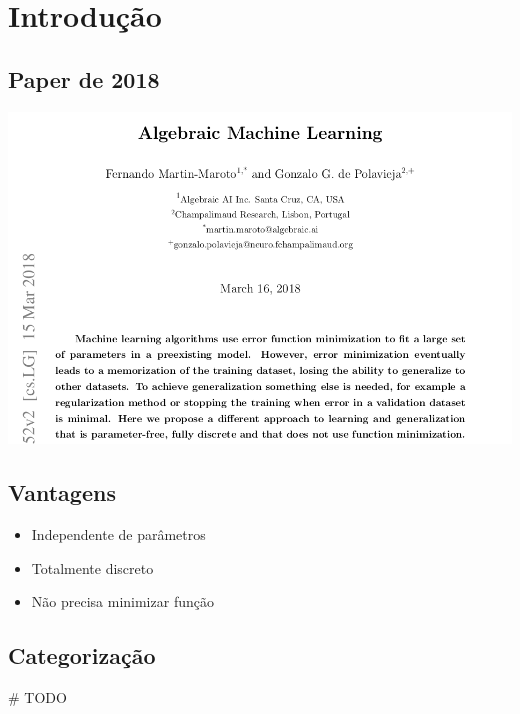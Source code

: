 \section{Introdução}
\subsection{Paper de 2018}
\begin{frame}{\subsecname}
    \centering
    \includegraphics[width=\textwidth]{fig/paper.png}
\end{frame}
\subsection{Vantagens}
\begin{frame}{\subsecname}
    \begin{itemize}
        \item<1-> Independente de parâmetros
        \item<2-> Totalmente discreto
        \item<3-> Não precisa minimizar função
    \end{itemize}
\end{frame}
\subsection{Categorização}
\begin{frame}{\subsecname}
    \# TODO
\end{frame}
